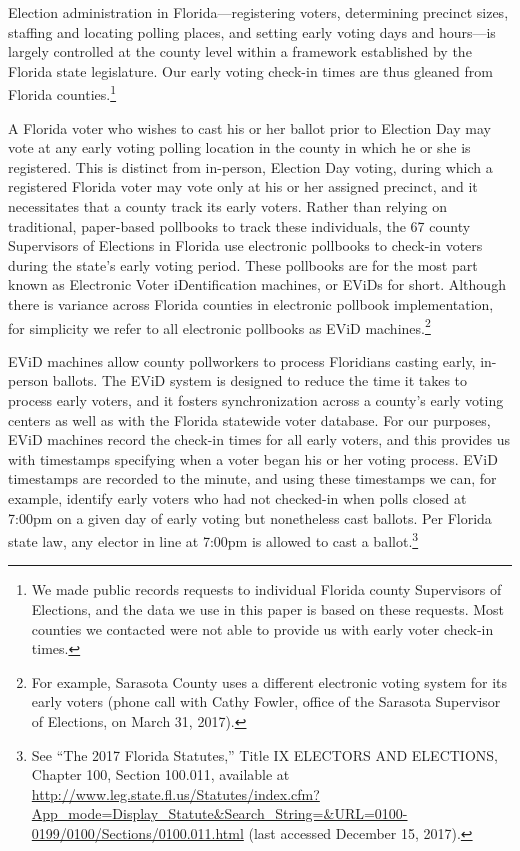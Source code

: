 \documentclass[12pt,titlepage]{article}
\begin{document}
Election administration in Florida---registering voters, determining
precinct sizes, staffing and locating polling places, and setting
early voting days and hours---is largely controlled at the county
level within a framework established by the Florida state
legislature. Our early voting check-in times are thus gleaned from
Florida counties.\footnote{We made public records requests to
  individual Florida county Supervisors of Elections, and the data we
  use in this paper is based on these requests. Most counties we
  contacted were not able to provide us with early voter check-in
  times.}


A Florida voter who wishes to cast his or her ballot prior to Election
Day may vote at any early voting polling location in the county in
which he or she is registered. This is distinct from in-person,
Election Day voting, during which a registered Florida voter may vote
only at his or her assigned precinct, and it necessitates that a
county track its early voters. Rather than relying on traditional,
paper-based pollbooks to track these individuals, the 67 county
Supervisors of Elections in Florida use electronic pollbooks to
check-in voters during the state's early voting period. These
pollbooks are for the most part known as Electronic Voter
iDentification machines, or EViDs for short. Although there is
variance across Florida counties in electronic pollbook
implementation, for simplicity we refer to all electronic pollbooks as
EViD machines.\footnote{For example, Sarasota
  County uses
  a different electronic voting system for its early voters (phone
  call with Cathy Fowler, office of the Sarasota
  Supervisor of Elections, on March 31, 2017).}


EViD machines allow county pollworkers to process Floridians casting
early, in-person ballots. The EViD system is designed to reduce the
time it takes to process early voters, and it fosters synchronization
across a county's early voting centers as well as with the Florida
statewide voter database. For our purposes, EViD machines record the
check-in times for all early voters, and this provides us with
\mbox{timestamps} specifying when a voter began his or her voting
process. EViD timestamps are recorded to the minute, and using these
timestamps we can, for example, identify early voters who had not
checked-in when polls closed at 7:00pm on a given day of early voting
but nonetheless cast ballots. Per Florida state law, any elector in
line at 7:00pm is allowed to cast a ballot.\footnote{See
  ``The 2017 Florida Statutes,'' Title IX ELECTORS AND ELECTIONS,
  Chapter 100, Section 100.011, available at
  \url{http://www.leg.state.fl.us/Statutes/index.cfm?App\_mode=Display\_Statute\&Search\_String=\&URL=0100-0199/0100/Sections/0100.011.html}
  (last accessed December 15, 2017).}
\end{document}
